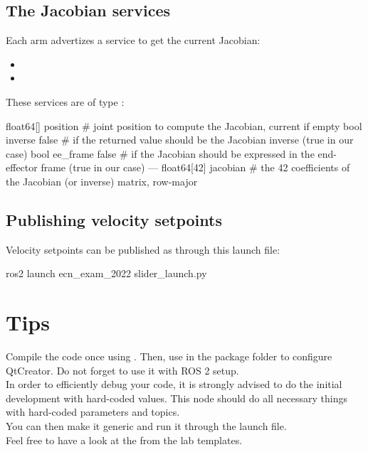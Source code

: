 \documentclass{ecnreport}
\begin{document}
\subsection{The Jacobian services}

Each arm advertizes a service to get the current Jacobian:
\begin{itemize}
 \item {}
 \item {}
\end{itemize}
These services are of type :
\begin{cppcode}
float64[] position      # joint position to compute the Jacobian, current if empty
bool inverse false      # if the returned value should be the Jacobian inverse (true in our case)
bool ee_frame false     # if the Jacobian should be expressed in the end-effector frame (true in our case)
---
float64[42] jacobian   # the 42 coefficients of the Jacobian (or inverse) matrix, row-major
\end{cppcode}

\subsection{Publishing velocity setpoints}

Velocity setpoints can be published as  through this launch file:
\begin{bashcodelarge}
 ros2 launch ecn_exam_2022 slider_launch.py
\end{bashcodelarge}

\section{Tips}

Compile the code once using . Then, use  in the package folder to configure QtCreator. Do not forget to use it with ROS 2 setup.\\

In order to efficiently debug your code, it is strongly advised to do the initial development with hard-coded values.
This node should do all necessary things with hard-coded parameters and topics.\\
You can then make it generic and run it through the launch file.\\

Feel free to have a look at the  from the lab templates.\\
\end{document}
